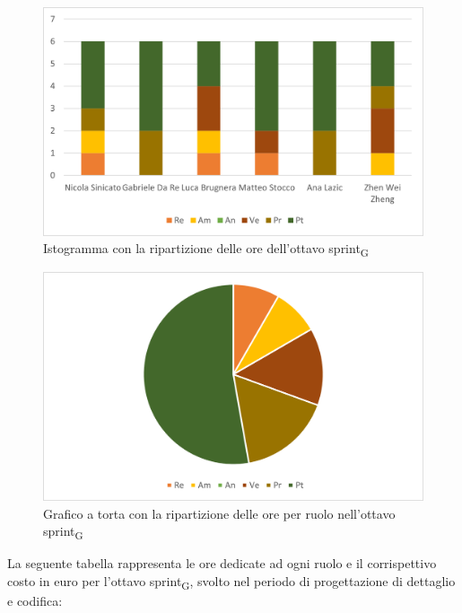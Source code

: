 \begin{figure}[H]
    \centering
    \includegraphics[scale=0.6]{img/grafi preventivo/istogrammi/codifica/sprint8.png}
    \caption{Istogramma con la ripartizione delle ore dell'ottavo sprint\textsubscript{G}}
\end{figure}
\begin{figure}[H]
    \centering
    \includegraphics[scale=0.6]{img/grafi preventivo/torta/codifica/sprint8.png}
    \caption{Grafico a torta con la ripartizione delle ore per ruolo nell'ottavo sprint\textsubscript{G}}
\end{figure}
La seguente tabella rappresenta le ore dedicate ad ogni ruolo e il corrispettivo costo in euro per l'ottavo sprint\textsubscript{G}, svolto nel periodo di progettazione di dettaglio e codifica: 

